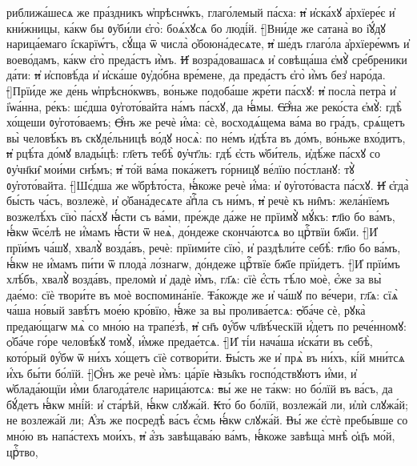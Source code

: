 риближа́шесѧ же пра́здникъ ѡ҆прѣснѡ́къ, глаго́лемый па́сха:
\st{и҆} и҆ска́хꙋ а҆рхїере́є и҆ кни́жницы, ка́кѡ бы ᲂу҆би́ли є҆го̀: боѧ́хꙋсѧ бо люді́й.
\st[]{В}ни́де же сатана̀ во і҆ꙋ́дꙋ нарица́емаго і҆скарїѡ́тъ, сꙋ́ща ѿ числа̀ ѻ҆боюна́десѧте,
\st{и҆} ше́дъ глаго́ла а҆рхїере́ѡмъ и҆ воево́дамъ, ка́кѡ є҆го̀ преда́стъ и҆̀мъ.
\st{И҆} возра́довашасѧ и҆ совѣща́ша є҆мꙋ̀ сре́бреники да́ти:
\st{и҆} и҆сповѣ́да и҆ и҆ска́ше ᲂу҆до́бна вре́мене, да преда́стъ є҆го̀ и҆̀мъ без̾ наро́да.
\st[]{П}рїи́де же де́нь ѡ҆прѣсно́кѡвъ, во́ньже подоба́ше жре́ти па́схꙋ:
\st{и҆} посла̀ петра̀ и҆ і҆ѡа́нна, ре́къ: шє́дша ᲂу҆гото́вайта на́мъ па́схꙋ, да ꙗ҆́мы.
\st{Ѡ҆́}на же реко́ста є҆мꙋ̀: гдѣ̀ хо́щеши ᲂу҆гото́ваемъ;
\st{Ѻ҆́}нъ же речѐ и҆́ма: сѐ, восходѧ́щема ва́ма во гра́дъ, срѧ́щетъ вы̀ человѣ́къ въ скꙋде́льницѣ во́дꙋ носѧ̀: по не́мъ и҆дѣ́та въ до́мъ, во́ньже вхо́дитъ,
\st{и҆} рцѣ́та до́мꙋ влады́цѣ: гл҃етъ тебѣ̀ ᲂу҆чт҃ль: гдѣ́ є҆сть ѡ҆би́тель, и҆дѣ́же па́схꙋ со ᲂу҆чн҃ки̑ мои́ми снѣ́мъ;
\st{и҆} то́й ва́ма пока́жетъ го́рницꙋ ве́лїю по́стланꙋ: тꙋ̀ ᲂу҆гото́вайта.
\st[]{Ш}є́дша же ѡ҆брѣто́ста, ꙗ҆́коже речѐ и҆́ма: и҆ ᲂу҆гото́васта па́схꙋ.
\st{И҆} є҆гда̀ бы́сть ча́съ, возлежѐ, и҆ ѻ҆бана́десѧте а҆пⷭ҇ла съ ни́мъ,
\st{и҆} речѐ къ ни̑мъ: жела́нїемъ возжелѣ́хъ сїю̀ па́схꙋ ꙗ҆́сти съ ва́ми, пре́жде да́же не прїимꙋ̀ мꙋ́къ:
\st{г}л҃ю бо ва́мъ, ꙗ҆́кѡ ѿсе́лѣ не и҆́мамъ ꙗ҆́сти ѿ неѧ̀, до́ндеже сконча́ютсѧ во црⷭ҇твїи бж҃їи.
\st[]{И҆} прїи́мъ ча́шꙋ, хвалꙋ̀ возда́въ, речѐ: прїими́те сїю̀, и҆ раздѣли́те себѣ̀:
\st{г}л҃ю бо ва́мъ, ꙗ҆́кѡ не и҆́мамъ пи́ти ѿ плода̀ ло́знагѡ, до́ндеже црⷭ҇твїе бж҃їе прїи́детъ.
\st[]{И҆} прїи́мъ хлѣ́бъ, хвалꙋ̀ возда́въ, преломѝ и҆ дадѐ и҆̀мъ, гл҃ѧ: сїѐ є҆́сть тѣ́ло моѐ, є҆́же за вы̀ дае́мо: сїѐ твори́те въ моѐ воспомина́нїе.
\st{Т}а́кожде же и҆ ча́шꙋ по ве́чери, гл҃ѧ: сїѧ̀ ча́ша но́вый завѣ́тъ мое́ю кро́вїю, ꙗ҆́же за вы̀ пролива́етсѧ:
\st{ѻ҆}ба́че сѐ, рꙋка̀ предаю́щагѡ мѧ̀ со мно́ю  на трапе́зѣ,
\st{и҆} сн҃ъ ᲂу҆́бѡ чл҃вѣ́ческїй и҆́детъ по рече́нномꙋ: ѻ҆ба́че го́ре человѣ́кꙋ томꙋ̀, и҆́мже предае́тсѧ.
\st[]{И҆} ті́и нача́ша и҆ска́ти въ себѣ̀, кото́рый ᲂу҆́бѡ ѿ ни́хъ хо́щетъ сїѐ сотвори́ти.
\st{Б}ы́сть же и҆ прѧ̀ въ ни́хъ, кі́й мни́тсѧ и҆́хъ бы́ти бо́лїй.
\st[]{Ѻ҆́}нъ же речѐ и҆̀мъ: ца́рїе ꙗ҆зы̑къ госпо́дствꙋютъ и҆́ми, и҆ ѡ҆блада́ющїи и҆́ми благода́телє нарица́ютсѧ:
\st{в}ы́ же не та́кѡ: но бо́лїй въ ва́съ, да бꙋ́детъ ꙗ҆́кѡ мні́й: и҆ ста́рѣй, ꙗ҆́кѡ слꙋжа́й.
\st{К}то́ бо бо́лїй, возлежа́й ли, и҆лѝ слꙋжа́й; не возлежа́й ли; А҆́зъ же посредѣ̀ ва́съ є҆́смь ꙗ҆́кѡ слꙋжа́й.
\st{В}ы́ же є҆стѐ пребы́вше со мно́ю въ напа́стехъ мои́хъ,
\st{и҆} а҆́зъ завѣщава́ю ва́мъ, ꙗ҆́коже завѣща̀ мнѣ̀ ѻ҆ц҃ъ мо́й, црⷭ҇тво,
